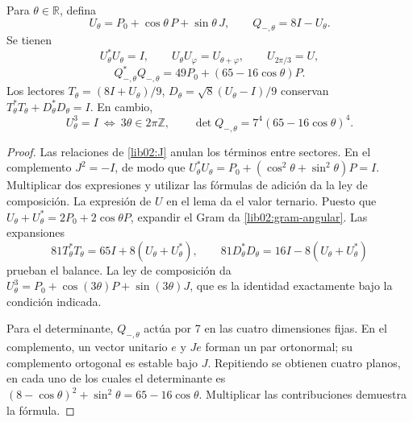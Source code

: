 \begin{theorem}
\label{lib02:Utheta}
Para \(\theta\in\mathbb R\), defina
\[
 U_\theta=P_0+\cos\theta\,P+\sin\theta\,J,\qquad
 Q_{-,\theta}=8I-U_\theta.
\]
Se tienen
\[
 U_\theta^*U_\theta=I,\qquad
 U_\theta U_\varphi=U_{\theta+\varphi},\qquad U_{2\pi/3}=U,
\]
\begin{equation}
 Q_{-,\theta}^*Q_{-,\theta}
 =49P_0+(65-16\cos\theta)P.
 \label{lib02:gram-angular}
\end{equation}
Los lectores
\(T_\theta=(8I+U_\theta)/9\),
\(D_\theta=\sqrt8(U_\theta-I)/9\) conservan
\(T_\theta^*T_\theta+D_\theta^*D_\theta=I\). En cambio,
\[
 U_\theta^3=I\ \Longleftrightarrow\ 3\theta\in2\pi\mathbb Z,
 \qquad
 \det Q_{-,\theta}=7^4(65-16\cos\theta)^4.
\]
\end{theorem}
\begin{proof}
Las relaciones de \cref{lib02:J} anulan los términos entre sectores.
En el complemento \(J^2=-I\), de modo que
\(U_\theta^*U_\theta=P_0+(\cos^2\theta+\sin^2\theta)P=I\).
Multiplicar dos expresiones y utilizar las fórmulas de adición da la
ley de composición. La expresión de \(U\) en el lema da el valor
ternario. Puesto que
\(U_\theta+U_\theta^*=2P_0+2\cos\theta P\), expandir el
Gram da \eqref{lib02:gram-angular}. Las expansiones
\[
 81T_\theta^*T_\theta=65I+8(U_\theta+U_\theta^*),\qquad
 81D_\theta^*D_\theta=16I-8(U_\theta+U_\theta^*)
\]
prueban el balance. La ley de composición da
\(U_\theta^3=P_0+\cos(3\theta)P+\sin(3\theta)J\), que es
la identidad exactamente bajo la condición indicada.

Para el determinante, \(Q_{-,\theta}\) actúa por 7 en las cuatro
dimensiones fijas. En el complemento, un vector unitario \(e\) y
\(Je\) forman un par ortonormal; su complemento ortogonal es estable
bajo \(J\). Repitiendo se obtienen cuatro planos, en cada uno de los
cuales el determinante es
\((8-\cos\theta)^2+\sin^2\theta=65-16\cos\theta\).
Multiplicar las contribuciones demuestra la fórmula.
\end{proof}

